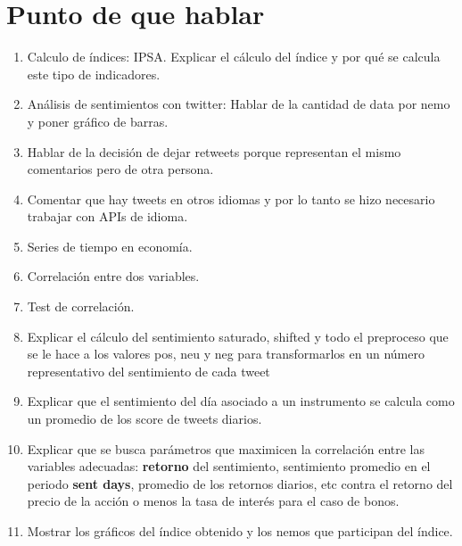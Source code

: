 \documentclass{article}
\begin{document}
\section{Punto de que hablar}
    \begin{enumerate}
        \item Calculo de índices: IPSA. Explicar el cálculo del índice y por qué se calcula este tipo de indicadores.
        \item Análisis de sentimientos con twitter: Hablar de la cantidad de data por nemo y poner gráfico de barras.
        \item Hablar de la decisión de dejar retweets porque representan el mismo comentarios pero de otra persona.
        \item Comentar que hay tweets en otros idiomas y por lo tanto se hizo necesario trabajar con APIs de idioma.
        \item Series de tiempo en economía.
        \item Correlación entre dos variables. 
        \item Test de correlación.
        \item Explicar el cálculo del sentimiento saturado, shifted y todo el preproceso que se le hace a los valores pos, neu y neg para transformarlos en un número representativo del sentimiento de cada tweet
        \item Explicar que el sentimiento del día asociado a un instrumento se calcula como un promedio de los score de tweets diarios.
        \item Explicar que se busca parámetros que maximicen la correlación entre las variables adecuadas: \textbf{retorno} del sentimiento, sentimiento promedio en el periodo \textbf{sent days}, promedio de los retornos diarios, etc contra el retorno del precio de la acción o menos la tasa de interés para el caso de bonos.
        \item Mostrar los gráficos del índice obtenido y los nemos que participan del índice.
    \end{enumerate}
\end{document}
